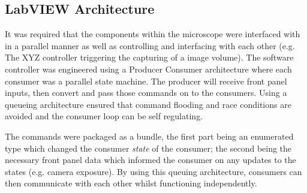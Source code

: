 \subsection{LabVIEW Architecture}


It was required that the components within the microscope were interfaced with in a parallel manner as well as controlling and interfacing with each other (e.g. The XYZ controller triggering the capturing of a image volume).
The software controller was engineered using a Producer Consumer architecture where each consumer was a parallel state machine.
The producer will receive front panel inputs, then convert and pass those commands on to the consumers.
Using a queueing architecture ensured that command flooding and race conditions are avoided and the consumer loop can be self regulating.

The commands were packaged as a bundle, the first part being an enumerated type which changed the consumer \emph{state} of the consumer; the second being the necessary front panel data which informed the consumer on any updates to the states (e.g. camera exposure).
By using this queuing architecture, consumers can then communicate with each other whilst functioning independently.

